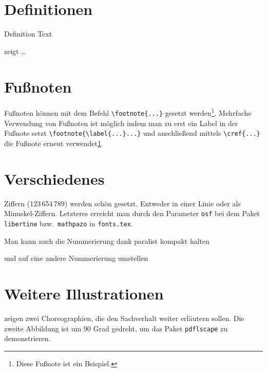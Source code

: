 

\section{Definitionen}
\begin{definition}[Title]
  \label{def:def1}
  Definition Text
\end{definition}

 zeigt \ldots

\section{Fußnoten}
Fußnoten können mit dem Befehl \verb+\footnote{...}+ gesetzt werden\footnote{\label{fussnote}Diese Fußnote ist ein Beispiel.
}.
Mehrfache Verwendung von Fußnoten ist möglich indem man zu erst ein Label in der Fußnote setzt \verb+\footnote{\label{...}...}+ und anschließend mittels \verb+\cref{...}+ die Fußnote erneut verwendet\cref{fussnote}.

\section{Verschiedenes}
\label{sec:diff}
\ifdeutsch
  Ziffern (123\,654\,789) werden schön gesetzt.
  Entweder in einer Linie oder als Minuskel-Ziffern.
  Letzteres erreicht man durch den Parameter \texttt{osf} bei dem Paket \texttt{libertine} bzw.\ \texttt{mathpazo} in \texttt{fonts.tex}.
\fi

\begin{compactenum}[I.]
  \item Man kann auch die Nummerierung dank paralist kompakt halten
  \item und auf eine andere Nummerierung umstellen
\end{compactenum}

\section{Weitere Illustrationen}
 zeigen zwei Choreographien, die den Sachverhalt weiter erläutern sollen.
Die zweite Abbildung ist um 90 Grad gedreht, um das Paket \texttt{pdflscape} zu demonstrieren.

